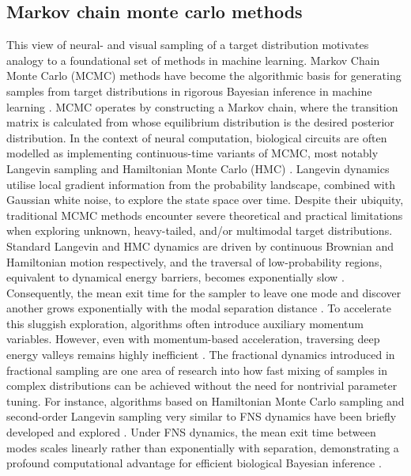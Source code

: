 \subsection{Markov chain monte carlo methods}\label{subsec:MCMC}
This view of neural- and visual sampling of a target distribution motivates analogy to a foundational set of methods in machine learning. Markov Chain Monte Carlo (MCMC) methods have become the algorithmic basis for generating samples from target distributions in rigorous Bayesian inference in machine learning \cite{cranmer_advances_2023, latuszynski_mcmc_2025, speagle_conceptual_2020, andrieu_particle_2010}. MCMC operates by constructing a Markov chain, where the transition matrix is calculated from  whose equilibrium distribution is the desired posterior distribution. In the context of neural computation, biological circuits are often modelled as implementing continuous-time variants of MCMC, most notably Langevin sampling and Hamiltonian Monte Carlo (HMC) \cite{latuszynski_mcmc_2025, betancourt_conceptual_2018}. Langevin dynamics utilise local gradient information from the probability landscape, combined with Gaussian white noise, to explore the state space over time.  Despite their ubiquity, traditional MCMC methods encounter severe theoretical and practical limitations when exploring unknown, heavy-tailed, and/or multimodal target distributions. Standard Langevin and HMC dynamics are driven by continuous Brownian and Hamiltonian motion respectively, and the traversal of low-probability regions, equivalent to dynamical energy barriers, becomes exponentially slow . Consequently, the mean exit time for the sampler to leave one mode and discover another grows exponentially with the modal separation distance \cite{latuszynski_mcmc_2025}. To accelerate this sluggish exploration, algorithms often introduce auxiliary momentum variables. However, even with momentum-based acceleration, traversing deep energy valleys remains highly inefficient \cite{latuszynski_mcmc_2025, neal_sampling_1996, betancourt_conceptual_2018}. The fractional dynamics introduced in fractional sampling are one area of research into how fast mixing of samples in complex distributions can be achieved without the need for nontrivial parameter tuning. For instance, algorithms based on Hamiltonian Monte Carlo sampling and second-order Langevin sampling very similar to FNS dynamics have been briefly developed and explored \cite{simsekli_fractional_nodate, ijcai2018p419, qi_fractional_2022}. Under FNS dynamics, the mean exit time between modes scales linearly rather than exponentially with separation, demonstrating a profound computational advantage for efficient biological Bayesian inference \cite{qi_fractional_2022}.